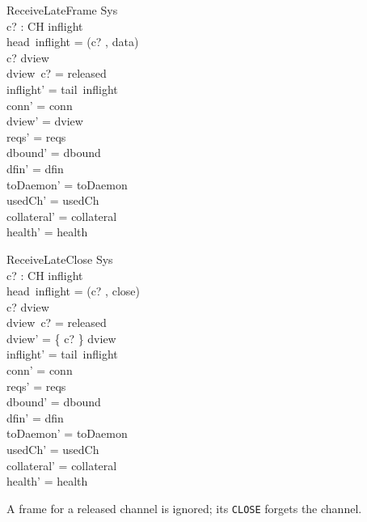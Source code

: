 \documentclass[a4paper,10pt,fleqn]{article}
\begin{document}
\begin{schema}{ReceiveLateFrame}
  \Delta Sys \\
  c? : CH
\where
  inflight \neq \langle \rangle \\
  head~inflight = (c? , data) \\
  c? \in \dom dview \\
  dview~c? = released \\
  inflight' = tail~inflight \\
  conn' = conn \\
  dview' = dview \\
  reqs' = reqs \\
  dbound' = dbound \\
  dfin' = dfin \\
  toDaemon' = toDaemon \\
  usedCh' = usedCh \\
  collateral' = collateral \\
  health' = health
\end{schema}

\begin{schema}{ReceiveLateClose}
  \Delta Sys \\
  c? : CH
\where
  inflight \neq \langle \rangle \\
  head~inflight = (c? , close) \\
  c? \in \dom dview \\
  dview~c? = released \\
  dview' = \{ c? \} \ndres dview \\
  inflight' = tail~inflight \\
  conn' = conn \\
  reqs' = reqs \\
  dbound' = dbound \\
  dfin' = dfin \\
  toDaemon' = toDaemon \\
  usedCh' = usedCh \\
  collateral' = collateral \\
  health' = health
\end{schema}

A frame for a released channel is ignored; its \texttt{CLOSE} forgets the
channel.
\end{document}

